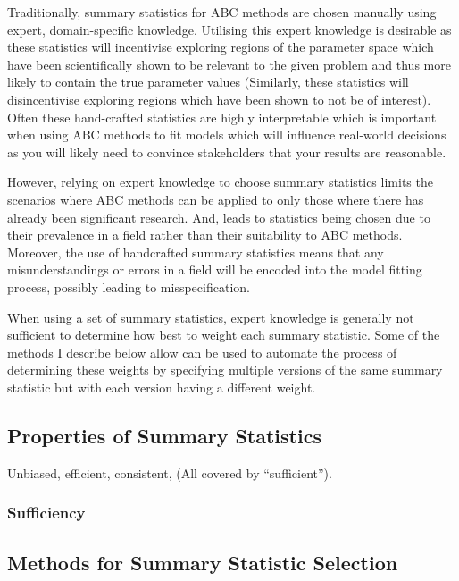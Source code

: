 \documentclass[11pt,a4paper,margin=0]{article}
\begin{document}
Traditionally, summary statistics for ABC methods are chosen manually using expert, domain-specific knowledge. Utilising this expert knowledge is desirable as these statistics will incentivise exploring regions of the parameter space which have been scientifically shown to be relevant to the given problem and thus more likely to contain the true parameter values (Similarly, these statistics will disincentivise exploring regions which have been shown to not be of interest). %
Often these hand-crafted statistics are highly interpretable which is important when using ABC methods to fit models which will influence real-world decisions as you will likely need to convince stakeholders that your results are reasonable.

\par However, relying on expert knowledge to choose summary statistics limits the scenarios where ABC methods can be applied to only those where there has already been significant research. And, leads to statistics being chosen due to their prevalence in a field rather than their suitability to ABC methods. Moreover, the use of handcrafted summary statistics means that any misunderstandings or errors in a field will be encoded into the model fitting process, possibly leading to misspecification.

\par When using a set of summary statistics, expert knowledge is generally not sufficient to determine how best to weight each summary statistic. Some of the methods I describe below allow can be used to automate the process of determining these weights by specifying multiple versions of the same summary statistic but with each version having a different weight.

\subsection{Properties of Summary Statistics}
  \par Unbiased, efficient, consistent, (All covered by ``sufficient'').


\subsubsection*{Sufficiency}\label{sec_sufficiency}

\subsection{Methods for Summary Statistic Selection}\label{sec_summary_stats_methods}
\end{document}
